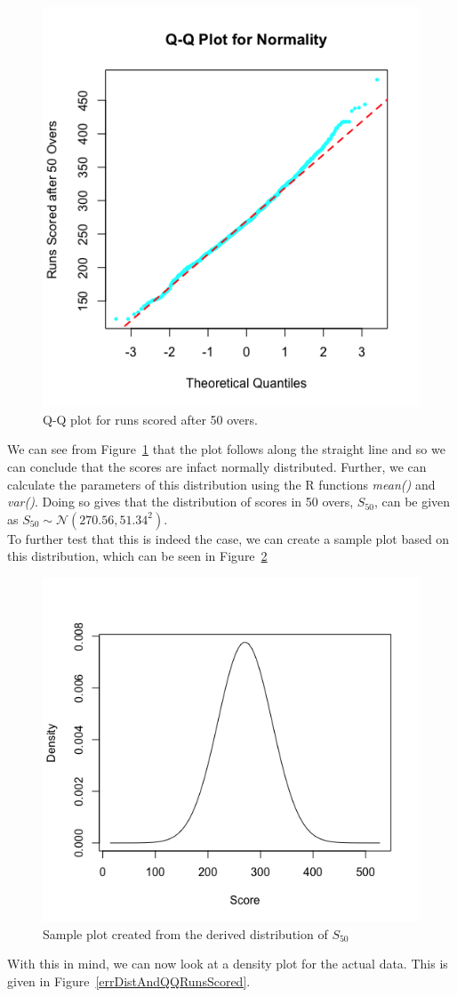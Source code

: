 \begin{figure}[h]
    \centering
    \includegraphics[width=0.4\linewidth]{figures/qqnormplot.png}
    \caption{Q-Q plot for runs scored after 50 overs.}
    \label{qqplot50}
\end{figure}

We can see from Figure~\ref{qqplot50} that the plot follows along the straight line and so we can conclude that the scores are infact normally distributed. 
Further, we can calculate the parameters of this distribution using the R functions \textit{mean()} and \textit{var()}. Doing so gives that the distribution
of scores in 50 overs, $S_{50}$, can be given as $S_{50} \sim \mathcal{N}(270.56,51.34^2)$. \\ 

To further test that this is indeed the case, we can create a sample plot based on this distribution, which can be seen in Figure~\ref{samplenorm}

\begin{figure}[h]
    \centering
    \includegraphics[width=0.4\linewidth]{figures/samplenorm.png}
    \caption{Sample plot created from the derived distribution of $S_{50}$}
    \label{samplenorm}
\end{figure}

With this in mind, we can now look at a density plot for the actual data. This is given in Figure~\ref{errDistAndQQRunsScored}.

